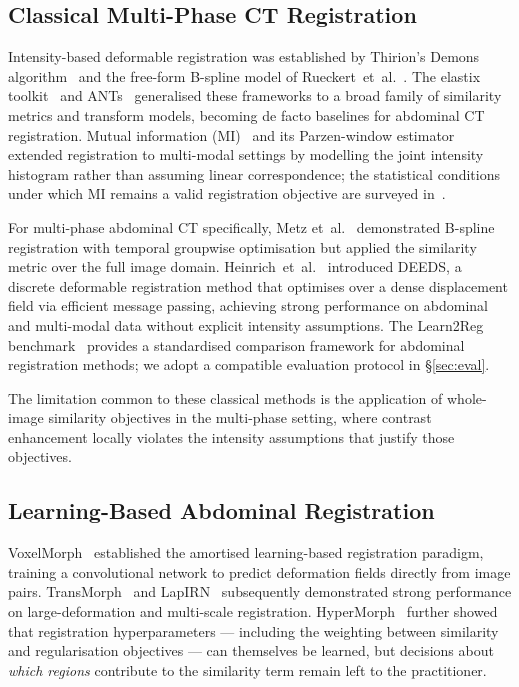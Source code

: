 \documentclass[10pt,twocolumn]{article}
\begin{document}
\subsection{Classical Multi-Phase CT Registration}
\label{sec:related_classical}

Intensity-based deformable registration was established by Thirion's
Demons algorithm~\cite{thirion1998} and the free-form B-spline model
of Rueckert~et~al.~\cite{rueckert1999}.
The elastix toolkit~\cite{klein2010} and ANTs~\cite{avants2008}
generalised these frameworks to a broad family of similarity metrics
and transform models, becoming de facto baselines for abdominal CT
registration.
Mutual information (MI)~\cite{wells1996} and its Parzen-window
estimator~\cite{mattes2001} extended registration to multi-modal
settings by modelling the joint intensity histogram rather than
assuming linear correspondence; the statistical conditions under which
MI remains a valid registration objective are surveyed in~\cite{pluim2003}.

For multi-phase abdominal CT specifically, Metz et~al.~\cite{metz2011}
demonstrated B-spline registration with temporal groupwise optimisation
but applied the similarity metric over the full image domain.
Heinrich~et~al.~\cite{heinrich2013} introduced DEEDS, a discrete
deformable registration method that optimises over a dense displacement
field via efficient message passing, achieving strong performance
on abdominal and multi-modal data without explicit intensity assumptions.
The Learn2Reg benchmark~\cite{hering2022} provides a standardised
comparison framework for abdominal registration methods; we adopt
a compatible evaluation protocol in \S\ref{sec:eval}.

The limitation common to these classical methods is the application
of whole-image similarity objectives in the multi-phase setting, where
contrast enhancement locally violates the intensity assumptions that
justify those objectives.

\subsection{Learning-Based Abdominal Registration}
\label{sec:related_dl}

VoxelMorph~\cite{balakrishnan2019} established the amortised
learning-based registration paradigm, training a convolutional network
to predict deformation fields directly from image pairs.
TransMorph~\cite{chen2022} and LapIRN~\cite{mok2020} subsequently
demonstrated strong performance on large-deformation and multi-scale
registration.
HyperMorph~\cite{hoopes2021} further showed that registration
hyperparameters — including the weighting between similarity and
regularisation objectives — can themselves be learned, but decisions
about \emph{which regions} contribute to the similarity term remain
left to the practitioner.
\end{document}
